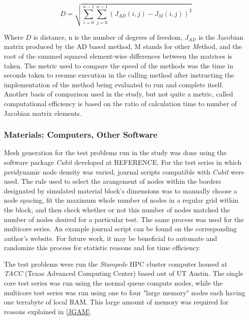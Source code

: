 \documentclass[preprint,12pt]{elsarticle}
\begin{document}
\begin{equation} D = \sqrt{\sum_{i=0}^{n-1}\sum_{j=0}^{n-1} (J_{AD}(i,j) - J_{M}(i,j))^2}
\end{equation}

Where $D$ is distance, n is the number of degrees of freedom, $J_{AD}$ is the Jacobian matrix
produced by the AD based method, M stands for other \emph{M}ethod, and the root of the summed
squared element-wise differences between the matrices is taken.  The metric used to compare the
speed of the methods was the time in seconds taken to resume execution in the calling method after
instructing the implementation of the method being evaluated to run and complete itself. Another
basis of comparison used in the study, but not quite a metric, called computational efficiency is
based on the ratio of calculation time to number of Jacobian matrix elements.

\subsubsection{Materials: Computers, Other Software} 

Mesh generation for the test problems run in the study was done using the software package
\emph{Cubit} developed at REFERENCE. For the test series in which peridynamic node density was
varied, journal scripts compatible with \emph{Cubit} were used. The rule used to select the
arangement of nodes within the borders designated by simulated material block's dimensions was to
manually choose a node spacing, fit the maximum whole number of nodes in a regular grid within the
block, and then check whether or not this number of nodes matched the number of nodes desired for a
particular test. The same process was used for the multicore series. An example journal script can
be found on the corresponding author's website. For future work, it may be beneficial to automate
and randomize this process for statistic reasons and for time efficiency. 

The test problems were run the \emph{Stampede} HPC cluster computer housed at \emph{TACC} (Texas
Advanced Computing Center) based out of UT Austin. The single core test series was run using the
normal queue compute nodes, while the multicore test series was run using one to four "large memory"
nodes each having one terrabyte of local RAM. This large amount of memory was required for reasons
explained in \ref{JGAM}.  
\end{document}
